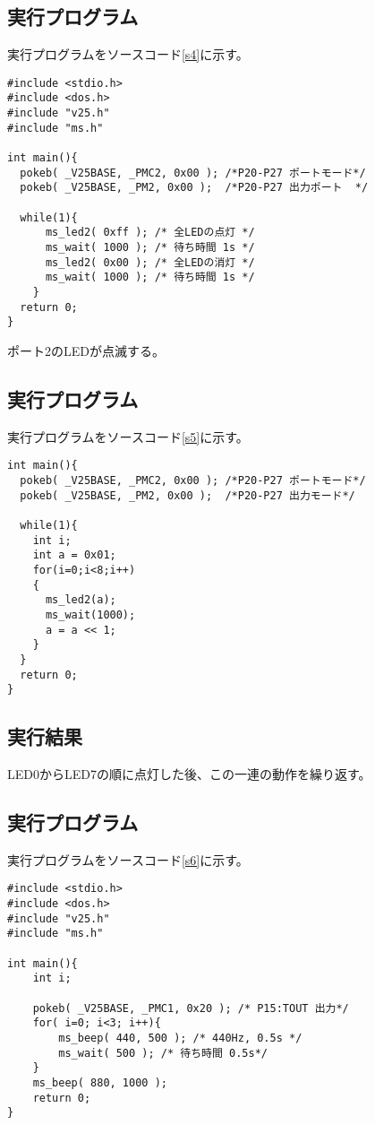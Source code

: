 \subsection{実行プログラム}
実行プログラムをソースコード\ref{s4}に示す。
\begin{lstlisting}[caption=演習3のプログラム,label=s4]
#include <stdio.h>
#include <dos.h>
#include "v25.h"
#include "ms.h"
 
int main(){
  pokeb( _V25BASE, _PMC2, 0x00 ); /*P20-P27 ポートモード*/
  pokeb( _V25BASE, _PM2, 0x00 );  /*P20-P27 出力ポート  */

  while(1){
      ms_led2( 0xff ); /* 全LEDの点灯 */
      ms_wait( 1000 ); /* 待ち時間 1s */
      ms_led2( 0x00 ); /* 全LEDの消灯 */
      ms_wait( 1000 ); /* 待ち時間 1s */
    }
  return 0;
}
\end{lstlisting}

ポート2のLEDが点滅する。

\subsection{実行プログラム}
実行プログラムをソースコード\ref{s5}に示す。
\begin{lstlisting}[caption=演習4のプログラム,label=s5]
int main(){
  pokeb( _V25BASE, _PMC2, 0x00 ); /*P20-P27 ポートモード*/
  pokeb( _V25BASE, _PM2, 0x00 );  /*P20-P27 出力モード*/
 
  while(1){
    int i;
    int a = 0x01;
    for(i=0;i<8;i++)
    {
      ms_led2(a);
      ms_wait(1000);
      a = a << 1;
    }
  }
  return 0;
}
\end{lstlisting}

\subsection{実行結果}
LED0からLED7の順に点灯した後、この一連の動作を繰り返す。

\subsection{実行プログラム}
実行プログラムをソースコード\ref{s6}に示す。
\begin{lstlisting}[caption=演習5のプログラム,label=s6]
#include <stdio.h>
#include <dos.h>
#include "v25.h"
#include "ms.h"
  
int main(){
    int i;

    pokeb( _V25BASE, _PMC1, 0x20 ); /* P15:TOUT 出力*/
    for( i=0; i<3; i++){
        ms_beep( 440, 500 ); /* 440Hz, 0.5s */
        ms_wait( 500 ); /* 待ち時間 0.5s*/
    }
    ms_beep( 880, 1000 );
    return 0;
}
\end{lstlisting}

